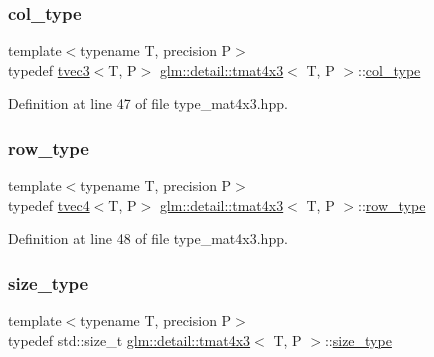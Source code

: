 \subsubsection{\texorpdfstring{col\+\_\+type}{col\_type}}
{\footnotesize\ttfamily template$<$typename T, precision P$>$ \\
typedef \hyperlink{structglm_1_1detail_1_1tvec3}{tvec3}$<$T, P$>$ \hyperlink{structglm_1_1detail_1_1tmat4x3}{glm\+::detail\+::tmat4x3}$<$ T, P $>$\+::\hyperlink{structglm_1_1detail_1_1tmat4x3_a58afd510f7ab968e5a86e20f2f3979de}{col\+\_\+type}}



Definition at line 47 of file type\+\_\+mat4x3.\+hpp.

\mbox{\label{structglm_1_1detail_1_1tmat4x3_a4c401c9b82fb80f9646813f0d9c1c70e}} 
\subsubsection{\texorpdfstring{row\+\_\+type}{row\_type}}
{\footnotesize\ttfamily template$<$typename T, precision P$>$ \\
typedef \hyperlink{structglm_1_1detail_1_1tvec4}{tvec4}$<$T, P$>$ \hyperlink{structglm_1_1detail_1_1tmat4x3}{glm\+::detail\+::tmat4x3}$<$ T, P $>$\+::\hyperlink{structglm_1_1detail_1_1tmat4x3_a4c401c9b82fb80f9646813f0d9c1c70e}{row\+\_\+type}}



Definition at line 48 of file type\+\_\+mat4x3.\+hpp.

\mbox{\label{structglm_1_1detail_1_1tmat4x3_aceab433265627d5787fe291463d19b91}} 
\subsubsection{\texorpdfstring{size\+\_\+type}{size\_type}}
{\footnotesize\ttfamily template$<$typename T, precision P$>$ \\
typedef std\+::size\+\_\+t \hyperlink{structglm_1_1detail_1_1tmat4x3}{glm\+::detail\+::tmat4x3}$<$ T, P $>$\+::\hyperlink{structglm_1_1detail_1_1tmat4x3_aceab433265627d5787fe291463d19b91}{size\+\_\+type}}



